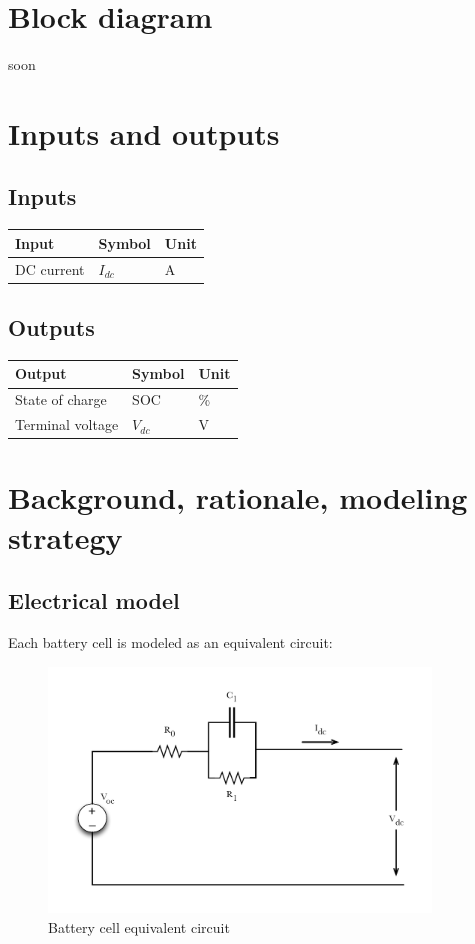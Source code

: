 \documentclass[../SimBALink.tex]{subfiles}
\begin{document}
\section{Block diagram}
soon

\section{Inputs and outputs}
	\subsection{Inputs}
	\begin{tabular}{ l | l | l  }
		Input					&	Symbol		&	Unit		\\	\hline
		DC current				&	$I_{dc}$		&	A		\\
	\end{tabular}
	
	\subsection{Outputs}
	\begin{tabular}{ l | l | l  }
		Output					&	Symbol		&	Unit		\\	\hline
		State of charge			&	SOC			&	\%		\\
		Terminal voltage			&	$V_{dc}$		&	V		\\
	\end{tabular}
	
\section{Background, rationale, modeling strategy}
	\subsection{Electrical model}
		Each battery cell is modeled as an equivalent circuit:
		
		\begin{figure}[h!]
				\centering
				\includegraphics[width=4in]{../Model/Powertrain/Battery_pack/Documentation/Figures/Battery_pack_equivalent_circuit}
				\caption{Battery cell equivalent circuit}
				\label{fig:battery_pack_equivalent_circuit}
		\end{figure}
		\FloatBarrier
		
\end{document}
